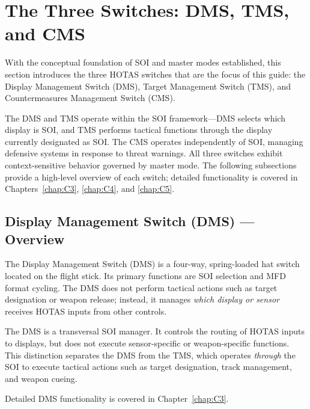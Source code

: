 \documentclass[11pt, a4paper, twoside]{report}
\begin{document}
\section{The Three Switches: DMS, TMS, and CMS}
\label{sec:C2-S3}

With the conceptual foundation of SOI and master modes established, this section introduces the three HOTAS switches that are the focus of this guide: the Display Management Switch (DMS), Target Management Switch (TMS), and Countermeasures Management Switch (CMS).

The DMS and TMS operate within the SOI framework—DMS selects which display is SOI, and TMS performs tactical functions through the display currently designated as SOI. The CMS operates independently of SOI, managing defensive systems in response to threat warnings. All three switches exhibit context-sensitive behavior governed by master mode. The following subsections provide a high-level overview of each switch; detailed functionality is covered in Chapters~\ref{chap:C3}, \ref{chap:C4}, and \ref{chap:C5}.


\subsection{Display Management Switch (DMS) — Overview}
\label{sec:C2-S3-S1}

The Display Management Switch (DMS) is a four-way, spring-loaded hat switch located on the flight stick. Its primary functions are SOI selection and MFD format cycling. The DMS does not perform tactical actions such as target designation or weapon release; instead, it manages \textit{which display or sensor} receives HOTAS inputs from other controls.

The DMS is a transversal SOI manager. It controls the routing of HOTAS inputs to displays, but does not execute sensor-specific or weapon-specific functions. This distinction separates the DMS from the TMS, which operates \textit{through} the SOI to execute tactical actions such as target designation, track management, and weapon cueing.

Detailed DMS functionality is covered in Chapter~\ref{chap:C3}.

\end{document}
